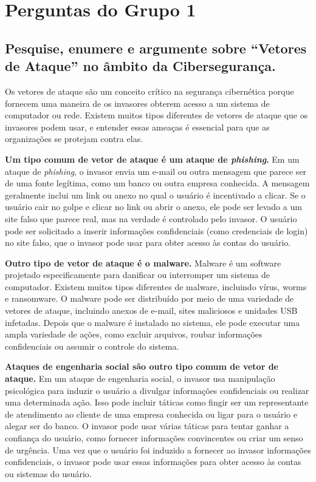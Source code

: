 \chapter{Perguntas do Grupo 1}

\section[Pergunta 1]{Pesquise, enumere e argumente sobre ``Vetores de Ataque'' no âmbito da Cibersegurança.}

Os vetores de ataque são um conceito crítico na segurança cibernética porque fornecem uma maneira de os invasores obterem acesso a um sistema de computador ou rede. Existem muitos tipos diferentes de vetores de ataque que os invasores podem usar, e entender essas ameaças é essencial para que as organizações se protejam contra elas.

\textbf{Um tipo comum de vetor de ataque é um ataque de \textit{phishing}.} Em um ataque de \textit{phishing}, o invasor envia um e-mail ou outra mensagem que parece ser de uma fonte legítima, como um banco ou outra empresa conhecida. A mensagem geralmente inclui um link ou anexo no qual o usuário é incentivado a clicar. Se o usuário cair no golpe e clicar no link ou abrir o anexo, ele pode ser levado a um site falso que parece real, mas na verdade é controlado pelo invasor. O usuário pode ser solicitado a inserir informações confidenciais (como credenciais de login) no site falso, que o invasor pode usar para obter acesso às contas do usuário.

\textbf{Outro tipo de vetor de ataque é o malware.} Malware é um software projetado especificamente para danificar ou interromper um sistema de computador. Existem muitos tipos diferentes de malware, incluindo vírus, worms e ransomware. O malware pode ser distribuído por meio de uma variedade de vetores de ataque, incluindo anexos de e-mail, sites maliciosos e unidades USB infetadas. Depois que o malware é instalado no sistema, ele pode executar uma ampla variedade de ações, como excluir arquivos, roubar informações confidenciais ou assumir o controle do sistema.

\textbf{Ataques de engenharia social são outro tipo comum de vetor de ataque.} Em um ataque de engenharia social, o invasor usa manipulação psicológica para induzir o usuário a divulgar informações confidenciais ou realizar uma determinada ação. Isso pode incluir táticas como fingir ser um representante de atendimento ao cliente de uma empresa conhecida ou ligar para o usuário e alegar ser do banco. O invasor pode usar várias táticas para tentar ganhar a confiança do usuário, como fornecer informações convincentes ou criar um senso de urgência. Uma vez que o usuário foi induzido a fornecer ao invasor informações confidenciais, o invasor pode usar essas informações para obter acesso às contas ou sistemas do usuário.

